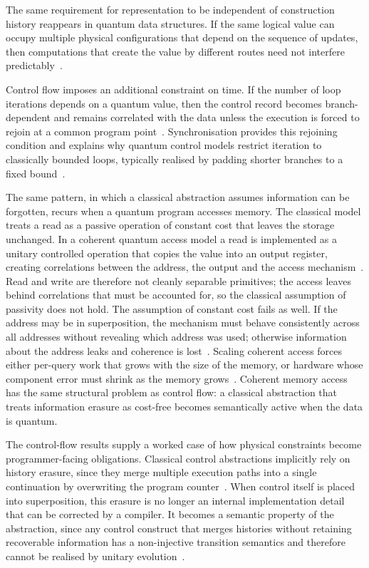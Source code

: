 The same requirement for representation to be independent of construction history reappears in quantum data structures.
If the same logical value can occupy multiple physical configurations that depend on the sequence of updates, then computations that create the value by different routes need not interfere predictably~\cite{yuan2025foundationalabstractions}.

Control flow imposes an additional constraint on time.
If the number of loop iterations depends on a quantum value, then the control record becomes branch-dependent and remains correlated with the data unless the execution is forced to rejoin at a common program point~\cite{yuan2025foundationalabstractions}.
Synchronisation provides this rejoining condition and explains why quantum control models restrict iteration to classically bounded loops, typically realised by padding shorter branches to a fixed bound~\cite{yuan2025foundationalabstractions}.

The same pattern, in which a classical abstraction assumes information can be forgotten, recurs when a quantum program accesses memory.
The classical model treats a read as a passive operation of constant cost that leaves the storage unchanged.
In a coherent quantum access model a read is implemented as a unitary controlled operation that copies the value into an output register, creating correlations between the address, the output and the access mechanism~\cite{jaques2025qram}.
Read and write are therefore not cleanly separable primitives; the access leaves behind correlations that must be accounted for, so the classical assumption of passivity does not hold.
The assumption of constant cost fails as well.
If the address may be in superposition, the mechanism must behave consistently across all addresses without revealing which address was used; otherwise information about the address leaks and coherence is lost~\cite{jaques2025qram}.
Scaling coherent access forces either per-query work that grows with the size of the memory, or hardware whose component error must shrink as the memory grows~\cite{jaques2025qram}.
Coherent memory access has the same structural problem as control flow: a classical abstraction that treats information erasure as cost-free becomes semantically active when the data is quantum.

The control-flow results supply a worked case of how physical constraints become programmer-facing obligations.
Classical control abstractions implicitly rely on history erasure, since they merge multiple execution paths into a single continuation by overwriting the program counter~\cite{yuan2025foundationalabstractions}.
When control itself is placed into superposition, this erasure is no longer an internal implementation detail that can be corrected by a compiler.
It becomes a semantic property of the abstraction, since any control construct that merges histories without retaining recoverable information has a non-injective transition semantics and therefore cannot be realised by unitary evolution~\cite{yuan2025foundationalabstractions}.

